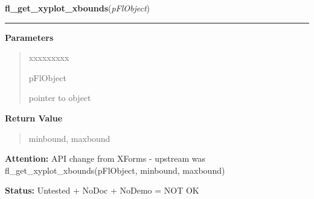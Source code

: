     \label{xformslib:flxyplot:fl_get_xyplot_xbounds}

    \vspace{0.5ex}

\hspace{.8\funcindent}\begin{boxedminipage}{\funcwidth}

    \raggedright \textbf{fl\_get\_xyplot\_xbounds}(\textit{pFlObject})

    \vspace{-1.5ex}

    \rule{\textwidth}{0.5\fboxrule}
\setlength{\parskip}{2ex}
\setlength{\parskip}{1ex}
      \textbf{Parameters}
      \vspace{-1ex}

      \begin{quote}
        \begin{Ventry}{xxxxxxxxx}

          \item[pFlObject]

          pointer to object

        \end{Ventry}

      \end{quote}

      \textbf{Return Value}
    \vspace{-1ex}

      \begin{quote}
      minbound, maxbound

      \end{quote}

\textbf{Attention:} API change from XForms - upstream was fl\_get\_xyplot\_xbounds(pFlObject, 
minbound, maxbound)



\textbf{Status:} Untested + NoDoc + NoDemo = NOT OK



    \end{boxedminipage}

    \label{xformslib:flxyplot:fl_get_xyplot_ybounds}

    \vspace{0.5ex}


